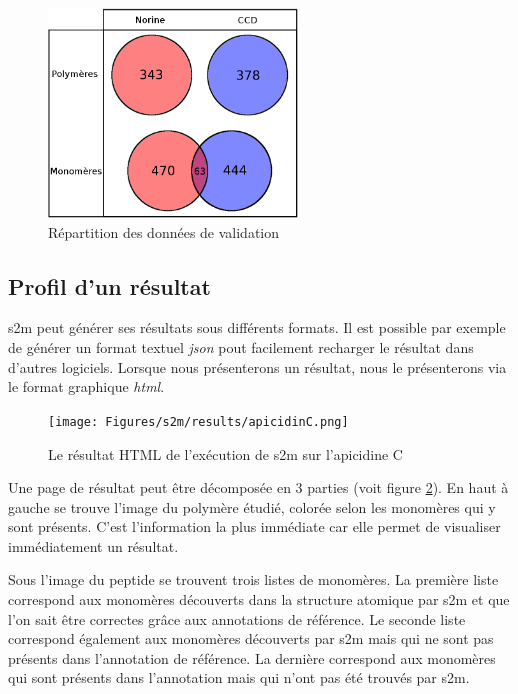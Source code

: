 \begin{figure}[!ht]
  \begin{center}
    \includegraphics[width=250px]{Figures/s2m/results/data.png}
    \caption{\label{data}Répartition des données de validation}
  \end{center}
\end{figure}



\subsection{Profil d'un résultat}

s2m peut générer ses résultats sous différents formats.
Il est possible par exemple de générer un format textuel \textit{json} pout facilement recharger le résultat dans d'autres logiciels.
Lorsque nous présenterons un résultat, nous le présenterons via le format graphique \textit{html}.

\begin{figure}[!ht]
  \begin{center}
    \texttt{[image: Figures/s2m/results/apicidinC.png]}
    \caption{\label{s2m_HTML}Le résultat HTML de l'exécution de s2m sur l'apicidine C}
  \end{center}
\end{figure}

Une page de résultat peut être décomposée en 3 parties (voit figure \ref{s2m_HTML}).
En haut à gauche se trouve l'image du polymère étudié, colorée selon les monomères qui y sont présents.
C'est l'information la plus immédiate car elle permet de visualiser immédiatement un résultat.

Sous l'image du peptide se trouvent trois listes de monomères.
La première liste correspond aux monomères découverts dans la structure atomique par s2m et que l'on sait être correctes grâce aux annotations de référence.
Le seconde liste correspond également aux monomères découverts par s2m mais qui ne sont pas présents dans l'annotation de référence.
La dernière correspond aux monomères qui sont présents dans l'annotation mais qui n'ont pas été trouvés par s2m.

